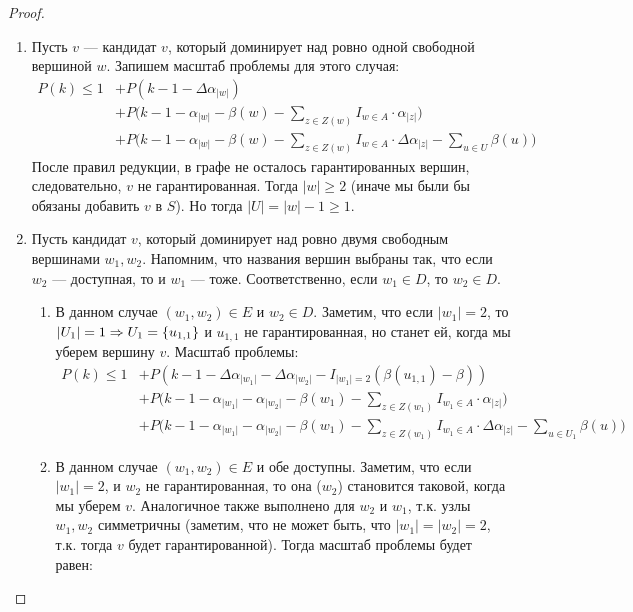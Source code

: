 \begin{proof}
\begin{enumerate}[label=\Alph*]
        \item Пусть \(v\) --- кандидат \(v\), который доминирует над ровно одной свободной вершиной \(w\). Запишем масштаб проблемы для этого случая: 
        \begin{align*}
            P(k) \le 1 &+ P(k - 1 - \Delta\alpha_{|w|}) \\
            &+ P\bigg(k - 1 - \alpha_{|w|} - \beta(w) - \sum_{z \in Z(w)}I_{w \in A} \cdot \alpha_{|z|}\bigg) \\
            &+ P\bigg(k - 1 - \alpha_{|w|} - \beta(w) - \sum_{z \in Z(w)}I_{w \in A} \cdot \Delta\alpha_{|z|} - \sum_{u \in U}\beta(u)\bigg)
        \end{align*}
        После правил редукции, в графе не осталось гарантированных вершин, следовательно, \(v\) не гарантированная. Тогда \(|w| \ge 2\) (иначе мы были бы обязаны добавить \(v\) в \(S\)). Но тогда \(|U| = |w| - 1 \ge 1\).
        \item Пусть кандидат \(v\), который доминирует над ровно двумя свободным вершинами \(w_1, w_2\). Напомним, что названия вершин выбраны так, что если \(w_2\) --- доступная, то и \(w_1\) --- тоже. Соответственно, если \(w_1 \in D\), то \(w_2 \in D\).
        \begin{enumerate}
            \item В данном случае \((w_1, w_2) \in E\) и \(w_2 \in D\). Заметим, что если \(|w_1| = 2\), то \(|U_1| = 1 \Rightarrow U_1 = \{u_{1,1}\}\) и \(u_{1, 1}\) не гарантированная, но станет ей, когда мы уберем вершину \(v\). Масштаб проблемы:
            \begin{align*}
                P(k) \le 1 &+ P(k - 1 - \Delta\alpha_{|w_1|} - \Delta\alpha_{|w_2|} - I_{|w_1| = 2}(\beta(u_{1,1}) - \beta)) \\
                &+ P\bigg(k - 1 - \alpha_{|w_1|} - \alpha_{|w_2|} - \beta(w_1) - \sum_{z \in Z(w_1)}I_{w_1 \in A} \cdot \alpha_{|z|}\bigg) \\
                &+ P\bigg(k - 1 - \alpha_{|w_1|} - \alpha_{|w_2|} - \beta(w_1) - \sum_{z \in Z(w_1)}I_{w_1 \in A} \cdot \Delta\alpha_{|z|}- \sum_{u \in U_1}\beta(u)\bigg)
            \end{align*}
            \item В данном случае \((w_1, w_2) \in E\) и обе доступны. Заметим, что если \(|w_1| = 2\), и \(w_2\) не гарантированная, то она (\(w_2\)) становится таковой, когда мы уберем \(v\). Аналогичное также выполнено для \(w_2\) и \(w_1\), т.к. узлы \(w_1, w_2\) симметричны (заметим, что не может быть, что \(|w_1| = |w_2| = 2\), т.к. тогда \(v\) будет гарантированной). Тогда масштаб проблемы будет равен:

\end{enumerate}
\end{enumerate}
\end{proof}
